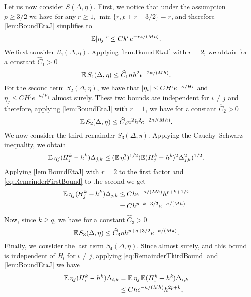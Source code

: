 \documentclass[10pt]{article}
\begin{document}
	Let us now consider $S(\Delta, \eta)$. First, we notice that under the assumption $p \geq 3/2$ we have for any $r \geq 1$, $\min\{r, p+r-3/2\} = r$, and therefore \cref{lem:BoundEtaJ} simplifies to 
	\begin{equation}
		\operatorname{\mathbb{E}}\lvert\eta_j\rvert^r \leq Ch^r e^{-r\kappa/(Mh)}.
	\end{equation}
	We first consider $S_1(\Delta, \eta)$. Applying \cref{lem:BoundEtaJ} with $r = 2$, we obtain for a constant $\hat C_1 > 0$ 
	\begin{equation}
		\operatorname{\mathbb{E}} S_1(\Delta, \eta) \leq \widehat C_1 n h^2 e^{-2\kappa/(Mh)}.
	\end{equation}
	For the second term $S_2(\Delta, \eta)$, we have  that $\lvert\eta_i\rvert\leq CH^i e^{-\kappa/H_i}$ and $\eta_j\leq CH^j e^{-\kappa/H_j}$ almost surely. These two bounds are independent for $i \neq j$ and therefore, applying \cref{lem:BoundEtaJ} with $r = 1$, we have for a constant $\hat C_2 > 0$
	\begin{equation}
		\operatorname{\mathbb{E}} S_2(\Delta, \eta) \leq \widehat C_2 n^2 h^2 e^{-2\kappa/(Mh)}.
	\end{equation}
	We now consider the third remainder $S_3(\Delta, \eta)$. Applying the Cauchy--Schwarz inequality, we obtain
	\begin{equation}
		\operatorname{\mathbb{E}} \eta_j (H_j^k - h^k) \Delta_{j,k} \leq (\operatorname{\mathbb{E}}\eta_j^2)^{1/2} (\operatorname{\mathbb{E}}(H_j^k - h^k)^2 \Delta_{j,k}^2)^{1/2}.
	\end{equation}
	Applying \cref{lem:BoundEtaJ} with $r = 2$ to the first factor and \eqref{eq:RemainderFirstBound} to the second we get
	\begin{equation}
	\begin{aligned}
		\operatorname{\mathbb{E}} \eta_j (H_j^k - h^k) \Delta_{j,k} &\leq C h e^{-\kappa/(Mh)}h^{p+k+1/2}\\
		&= C h^{p+k+3/2}e^{-\kappa/(Mh)}
	\end{aligned}
	\end{equation}
	Now, since $k \geq q$, we have for a constant $\hat C_3 > 0$
	\begin{equation}
		\operatorname{\mathbb{E}} S_3(\Delta, \eta) \leq \widehat C_3 n h^{p+q+3/2}e^{-\kappa/(Mh)}. 
	\end{equation}
	Finally, we consider the last term $S_4(\Delta, \eta)$. Since  almost surely, and this bound is independent of $H_i$ for $i \neq j$, applying \eqref{eq:RemainderThirdBound} and \cref{lem:BoundEtaJ} we have
	\begin{equation}
	\begin{aligned}
		\operatorname{\mathbb{E}}\eta_j(H_i^k - h^k)\Delta_{i,k} &= \operatorname{\mathbb{E}}\eta_j \operatorname{\mathbb{E}} (H_i^k - h^k)\Delta_{i,k}\\
		&\leq Ch e^{-\kappa/(Mh)}h^{2p+k},
	\end{aligned}
	\end{equation}
\end{document}
